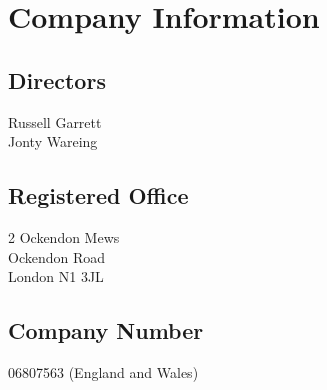\tableofcontents
\vfill
\section{Company Information}

\subsection{Directors}
Russell Garrett \\
Jonty Wareing 

\subsection{Registered Office}

2 Ockendon Mews \\
Ockendon Road \\
London N1 3JL

\subsection{Company Number}
06807563 (England and Wales)
\pagebreak
